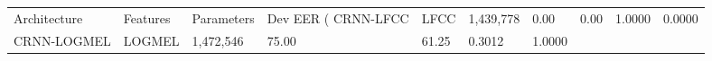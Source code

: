 \begin{tabular}{lllllll}
\toprule
Architecture & Features & Parameters & Dev EER (%
\midrule
CRNN-LFCC & LFCC & 1,439,778 & 0.00 & 0.00 & 1.0000 & 0.0000 \\
CRNN-LOGMEL & LOGMEL & 1,472,546 & 75.00 & 61.25 & 0.3012 & 1.0000 \\
\bottomrule
\end{tabular}
